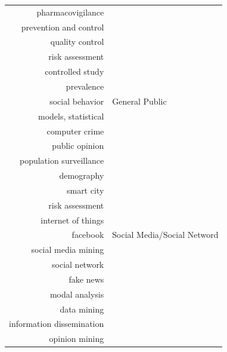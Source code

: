 \begin{center}
\begin{longtable}{rl}
        pharmacovigilance               &                              \\
        prevention and control          &                              \\
        quality control                 &                              \\
        risk assessment                 &                              \\
        controlled study                &                              \\
        prevalence                      &                              \\
        social behavior                 & General Public               \\
        models, statistical             &                              \\
        computer crime                  &                              \\
        public opinion                  &                              \\
        population surveillance         &                              \\
        demography                      &                              \\
        smart city                      &                              \\
        risk assessment                 &                              \\
        internet of things              &                              \\
        facebook                        & Social Media/Social Netword  \\
        social media mining             &                              \\
        social network                  &                              \\
        fake news                       &                              \\
        modal analysis                  &                              \\
        data mining                     &                              \\
        information dissemination       &                              \\
        opinion mining                  &                              \\

\end{longtable}
\end{center}
